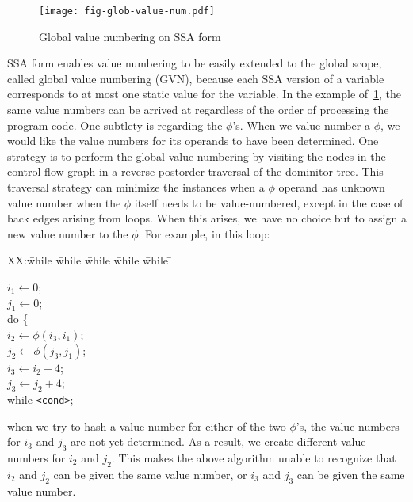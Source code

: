 \begin{figure}[t]
\centering
\texttt{[image: fig-glob-value-num.pdf]}
\caption{Global value numbering on SSA form}
\label{fig:glob-value-num}
\end{figure}

SSA form enables value numbering to be easily extended to the global scope,
called global value numbering (GVN), because each SSA version of a variable
corresponds to at most one static value for the variable.  In the example
of~\ref{fig:glob-value-num}, the same value numbers can be arrived at
regardless of the order of processing the program code.  One subtlety is
regarding the $\phi$'s.  When we value number a $\phi$, we would like the
value numbers for its operands to have been determined.  One strategy is to
perform the global value numbering by visiting the nodes in the control-flow graph in a reverse postorder traversal of the dominitor tree.
This traversal strategy can minimize the instances when a $\phi$ operand has 
unknown value number when the $\phi$ itself needs to be value-numbered,
except in the case of back edges arising from loops.  When this arises,
we have no choice but to assign a new value number to the $\phi$.
For example, in this loop:
\begin{tabbing}
XX:\= while \= while \= while \= while \= while \= \kill

\> \> $i_1 \leftarrow 0$; \\
\> \> $j_1 \leftarrow 0$; \\
\> \> do \{ \\
\> \> \> $i_2 \leftarrow \phi(i_3, i_1)$; \\
\> \> \> $j_2 \leftarrow \phi(j_3, j_1)$; \\
\> \> \> $i_3 \leftarrow i_2 + 4$; \\
\> \> \> $j_3 \leftarrow j_2 + 4$; \\
\> \> while \texttt{<cond>}; \\
\end{tabbing}
when we try to hash a value number for either of the two $\phi$'s, the value
numbers for $i_3$ and $j_3$ are not yet determined.  As a result, we create
different value numbers for $i_2$ and $j_2$.  This makes the above algorithm
unable to recognize that $i_2$ and $j_2$ can be given the same value number,
or $i_3$ and $j_3$ can be given the same value number.

